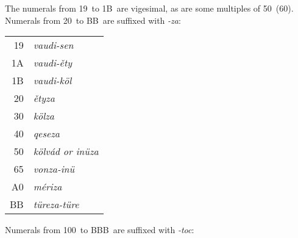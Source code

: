 \documentclass[grammar]{subfiles}
\begin{document}

	\newpage
	The numerals from 19\duo\ to 1B\duo\ are vigesimal, as are some multiples of 50\duo\ (60\dec). Numerals from 20\duo\ to BB\duo\ are suffixed with \emph{-za}:

	\begin{exe}
		\ex
		\begin{tabular}[t]{r >{\itshape}l}
			19\duo & vaudi-sen\\
			1A\duo & vaudi-ěty\\
			1B\duo & vaudi-köl\\
			20\duo & ětyza\\
			30\duo & kölza\\
			40\duo & qeseza\\
			50\duo & kölvád \textup{or} inüza\\
			65\duo & vonza-inü\\
			A0\duo & mériza\\
			BB\duo & türeza-türe\\
		\end{tabular}
	\end{exe}

	Numerals from 100\duo\ to BBB\duo\ are suffixed with \emph{-toc}:
\end{document}
